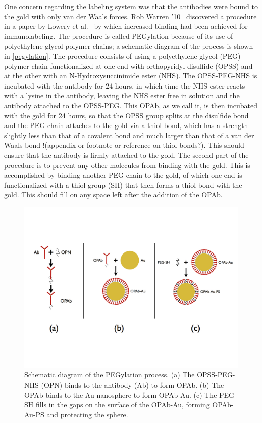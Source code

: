 One concern regarding the labeling system was that the antibodies were bound to the gold with only van der Waals forces. Rob Warren '10~\citep{warren} discovered a procedure in a paper by Lowery et al.~\citep{westpegylation} by which increased binding had been achieved for immunolabeling. The procedure is called PEGylation because of its use of polyethylene glycol polymer chains; a schematic diagram of the process is shown in \autoref{pegylation}. The procedure consists of using a polyethylene glycol (PEG) polymer chain functionalized at one end with orthopyridyl disulfide (OPSS) and at the other with an N-Hydroxysuccinimide ester (NHS). The OPSS-PEG-NHS is incubated with the antibody for 24 hours, in which time the NHS ester reacts with a lysine in the antibody, leaving the NHS ester free in solution and the antibody attached to the OPSS-PEG. This OPAb, as we call it, is then incubated with the gold for 24 hours, so that the OPSS group splits at the disulfide bond and the PEG chain attaches to the gold via a thiol bond, which has a strength slightly less than that of a covalent bond and much larger than that of a van der Waals bond !(appendix or footnote or reference on thiol bonds?). This should ensure that the antibody is firmly attached to the gold. The second part of the procedure is to prevent any other molecules from binding with the gold. This is accomplished by binding another PEG chain to the gold, of which one end is functionalized with a thiol group (SH) that then forms a thiol bond with the gold. This should fill on any space left after the addition of the OPAb. 

\begin{figure}[htbp]
\centering
\includegraphics[keepaspectratio,width=\textwidth,height=0.75\textheight]{pegylation.jpg}
\caption{Schematic diagram of the PEGylation process. (a) The OPSS-PEG-NHS (OPN) binds to the antibody (Ab) to form OPAb. (b) The OPAb binds to the Au nanosphere to form OPAb-Au. (c) The PEG-SH fills in the gaps on the surface of the OPAb-Au, forming OPAb-Au-PS and protecting the sphere.}
\label{pegylation}
\end{figure}



